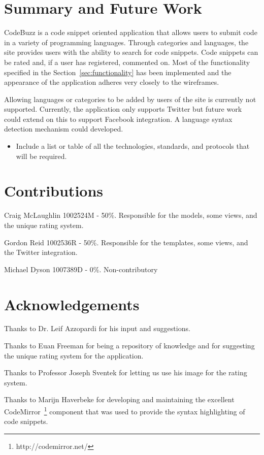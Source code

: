 \documentclass{sig-alt-release2}
\begin{document}
\section{Summary and Future Work}

CodeBuzz is a code snippet oriented application that allows users to submit code
in a variety of programming languages. Through categories and languages,
the site provides users with the ability to search for code snippets.
Code snippets can be rated and, if a user has registered, commented on.
Most of the functionality specified in the
Section~\ref{sec:functionality} has been implemented and the appearance
of the application adheres very closely to the wireframes.

Allowing languages or categories to be added by users of the site is
currently not supported.
Currently, the application only supports Twitter but future work could
extend on this to support Facebook integration. A language syntax
detection mechanism could developed.

\begin{itemize}
\item Include a list or table of all the technologies, standards,
and protocols that will be required.
\end{itemize}

\section{Contributions}

Craig McLaughlin 1002524M - 50\%. Responsible for the models, some views, and
the unique rating system.

Gordon Reid 1002536R - 50\%. Responsible for the templates, some views, and the
Twitter integration.

Michael Dyson 1007389D - 0\%. Non-contributory

\section{Acknowledgements}

Thanks to Dr. Leif Azzopardi for his input and suggestions.

Thanks to Euan Freeman for being a repository of knowledge and for
suggesting the unique rating system for the application.

Thanks to Professor Joseph Sventek for letting us use his image for the
rating system.

Thanks to Marijn Haverbeke for developing and maintaining the excellent
CodeMirror~\footnote{http://codemirror.net/} component that was used to
provide the syntax highlighting of code snippets.
\end{document}
